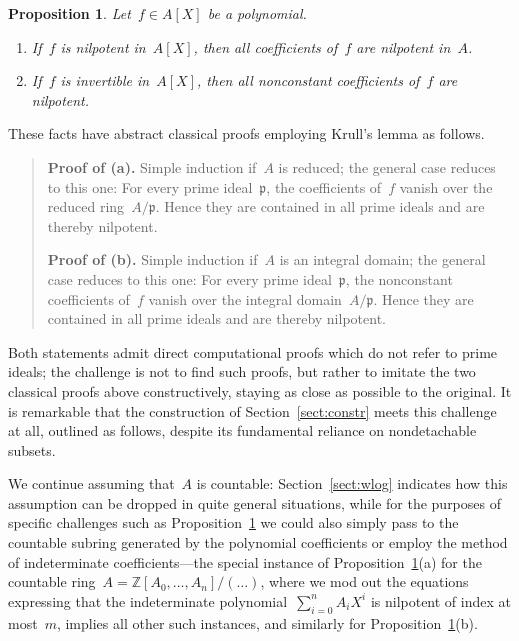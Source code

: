 \documentclass[com,11pt,crcready]{iosart2x}
\theoremstyle{definition}
\theoremstyle{plain}
\newtheorem{proposition}[definition]{Proposition}
\theoremstyle{remark}
\newcommand{\?}{\,{:}\,}
\newcommand{\ppp}{\mathfrak{p}}
\newcommand{\ZZ}{\mathbb{Z}}
\renewcommand{\_}{\mathpunct{.}\,}
\begin{document}
\begin{proposition}\label{prop:test-cases}Let~$f \in A[X]$ be a polynomial.
\begin{enumerate}
\item[(a)] If~$f$ is nilpotent in~$A[X]$, then all coefficients of~$f$ are nilpotent in~$A$.
\item[(b)] If~$f$ is invertible in~$A[X]$, then all nonconstant coefficients of~$f$ are nilpotent.
\end{enumerate}
\end{proposition}

These facts have abstract classical proofs employing Krull's lemma as follows.

\begin{quote}\small
  \textbf{Proof of (a).} Simple induction if~$A$ is
  reduced; the general case reduces to this one: For every prime ideal~$\ppp$,
  the coefficients of~$f$ vanish over the reduced ring~$A/\ppp$. Hence they are
  contained in all prime ideals and are thereby
  nilpotent.\medskip

  \textbf{Proof of (b).} Simple induction if~$A$ is an
  integral domain; the general case reduces to this one: For every prime
  ideal~$\ppp$, the nonconstant coefficients of~$f$ vanish over the integral
  domain~$A/\ppp$. Hence they are contained in all prime ideals
  and are thereby nilpotent.
\end{quote}

Both statements admit direct computational proofs which do not
refer to prime ideals; the challenge is not to find such proofs, but rather to
imitate the two classical proofs above constructively, staying as close as
possible to the original. It is remarkable that the construction of
Section~\ref{sect:constr} meets this challenge at all, outlined as follows, despite its fundamental
reliance on nondetachable subsets.

We continue assuming that~$A$ is countable:
Section~\ref{sect:wlog} indicates how this assumption can be dropped in quite
general situations, while for the purposes of specific challenges such as Proposition~\ref{prop:test-cases} we could also
simply pass to the countable subring generated by the polynomial coefficients
or employ the method of indeterminate coefficients---the special instance of
Proposition~\ref{prop:test-cases}(a) for the countable ring~$A =
\ZZ[A_0,\ldots,A_n]/(\ldots)$, where we mod out the equations expressing that
the indeterminate polynomial~$\sum_{i=0}^n A_i X^i$ is nilpotent of
index at most~$m$, implies all other such instances, and similarly for
Proposition~\ref{prop:test-cases}(b).
\end{document}
